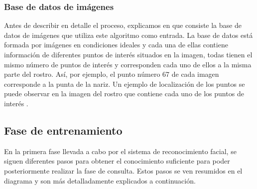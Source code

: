 \subsubsection{Base de datos de imágenes}

Antes de describir en detalle el proceso, explicamos en que consiste la base de datos de imágenes que utiliza este algoritmo como entrada. La base de datos est\'a formada por imágenes en condiciones ideales y cada una de ellas contiene información de diferentes puntos de interés situados en la imagen, todas tienen el mismo n\'umero de puntos de interés y corresponden cada uno de ellos a la misma parte del rostro. As\'i, por ejemplo, el punto n\'umero 67 de cada imagen corresponde a la punta de la nariz. Un ejemplo de localización de los puntos se puede observar en la imagen del rostro que contiene cada uno de los puntos de interés .

\subsection{Fase de entrenamiento}

En la primera fase llevada a cabo por el sistema de reconocimiento facial, se siguen diferentes pasos para obtener el conocimiento suficiente para poder posteriormente realizar la fase de consulta. Estos pasos se ven resumidos en el diagrama  y son m\'as detalladamente explicados a continuación. 



